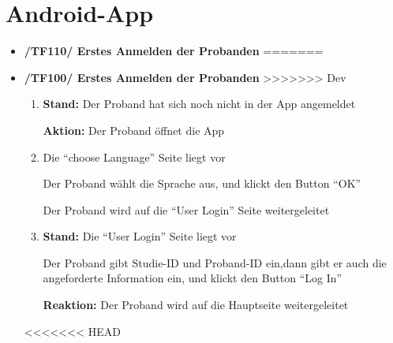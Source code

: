 \documentclass[a4paper]{scrreprt}
\begin{document}
	
	      \section{Android-App}
              \begin{itemize}
<<<<<<< HEAD
                  \item \textbf{/TF110/ Erstes Anmelden der Probanden}
=======
                  \item \textbf{/TF100/ Erstes Anmelden der Probanden}
>>>>>>> Dev
                  \begin{enumerate}
                        \item \par \textbf{Stand: }Der Proband hat sich noch nicht in der App angemeldet
                        \par \textbf{Aktion: }Der Proband öffnet die App
                        \par {}

                        \par \textbf{{\color{blue}{Reaktion: }}} {\color{blue}{Die App wechselt auf die ``choose Language'' Seite}}
                        \item \par \textbf{{\color{blue}{Stand: }}}{\color{blue} Die ``choose Language'' Seite liegt vor}
                        \par \textbf{{\color{blue}{Aktion: }}}{\color{blue}Der Proband wählt die Sprache aus, und klickt den Button ``OK''}
                        \par \textbf{{\color{blue}{Reaktion: }}}{\color{blue}Der Proband wird auf die ``User Login'' Seite weitergeleitet}
                        \item \par \textbf{Stand: }Die ``User Login'' Seite liegt vor
                        \par {}
                        \par \textbf{{\color{blue}{Aktion: }}}{\color{blue}Der Proband gibt Studie-ID und Proband-ID ein,dann gibt er auch die angeforderte Information ein, und klickt den Button ``Log In''}
                        \par \textbf{Reaktion: }Der Proband wird auf die Hauptseite weitergeleitet
                  \end{enumerate}
<<<<<<< HEAD


\end{itemize}
\end{document}
